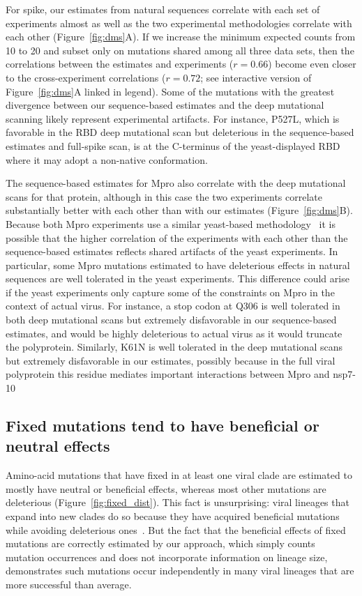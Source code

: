 \documentclass[9pt,twocolumn,twoside]{gsajnl_modified}
\begin{document}
For spike, our estimates from natural sequences correlate with each set of experiments almost as well as the two experimental methodologies correlate with each other (Figure~\ref{fig:dms}A).
If we increase the minimum expected counts from 10 to 20 and subset only on mutations shared among all three data sets, then the correlations between the estimates and experiments ($r = 0.66$) become even closer to the cross-experiment correlations ($r = 0.72$; see interactive version of Figure~\ref{fig:dms}A linked in legend).
Some of the mutations with the greatest divergence between our sequence-based estimates and the deep mutational scanning likely represent experimental artifacts.
For instance, P527L, which is favorable in the RBD deep mutational scan but deleterious in the sequence-based estimates and full-spike scan, is at the C-terminus of the yeast-displayed RBD~\citep{starr2020deep} where it may adopt a non-native conformation.

The sequence-based estimates for Mpro also correlate with the deep mutational scans for that protein, although in this case the two experiments correlate substantially better with each other than with our estimates (Figure~\ref{fig:dms}B).
Because both Mpro experiments use a similar yeast-based methodology~\citep{flynn2022,iketani2022functional} it is possible that the higher correlation of the experiments with each other than the sequence-based estimates reflects shared artifacts of the yeast experiments.
In particular, some Mpro mutations estimated to have deleterious effects in natural sequences are well tolerated in the yeast experiments.
This difference could arise if the yeast experiments only capture some of the constraints on Mpro in the context of actual virus.
For instance, a stop codon at Q306 is well tolerated in both deep mutational scans but extremely disfavorable in our sequence-based estimates, and would be highly deleterious to actual virus as it would truncate the polyprotein.
Similarly, K61N is well tolerated in the deep mutational scans but extremely disfavorable in our estimates, possibly because in the full viral polyprotein this residue mediates important interactions between Mpro and nsp7-10~\citep{yadav2022biochemical}

\subsection*{Fixed mutations tend to have beneficial or neutral effects}
Amino-acid mutations that have fixed in at least one viral clade are estimated to mostly have neutral or beneficial effects, whereas most other mutations are deleterious (Figure~\ref{fig:fixed_dist}).
This fact is unsurprising: viral lineages that expand into new clades do so because they have acquired beneficial mutations while avoiding deleterious ones~\citep{luksza2014predictive, koelle2015effects, huddleston2020integrating}.
But the fact that the beneficial effects of fixed mutations are correctly estimated by our approach, which simply counts mutation occurrences and does not incorporate information on lineage size, demonstrates such mutations occur independently in many viral lineages that are more successful than average.
\end{document}
